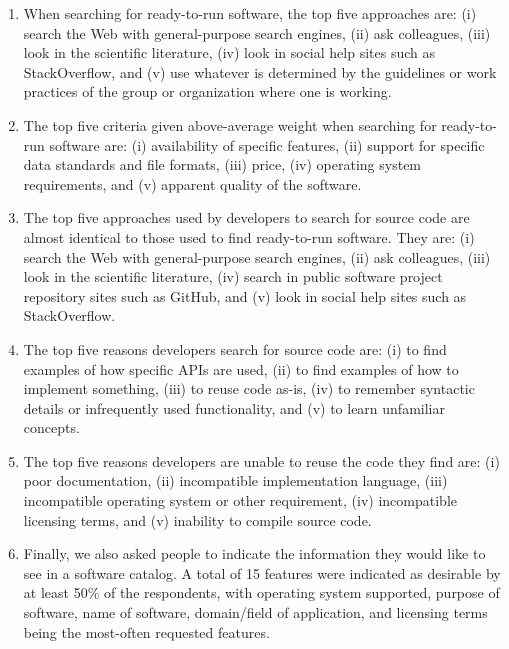 \documentclass{casicswhitepaper}
\begin{document}
\begin{enumerate}

\item When searching for ready-to-run software, the top five approaches are: (i) search the Web with general-purpose search engines, (ii) ask colleagues, (iii) look in the scientific literature, (iv) look in social help sites such as StackOverflow, and (v) use whatever is determined by the guidelines or work practices of the group or organization where one is working.

\item The top five criteria given above-average weight when searching for ready-to-run software are: (i) availability of specific features, (ii) support for specific data standards and file formats, (iii) price, (iv) operating system requirements, and (v) apparent quality of the software.

\item The top five approaches used by developers to search for source code are almost identical to those used to find ready-to-run software.  They are: (i) search the Web with general-purpose search engines, (ii) ask colleagues, (iii) look in the scientific literature, (iv) search in public software project repository sites such as GitHub, and (v) look in social help sites such as StackOverflow.

\item The top five reasons developers search for source code are: (i) to find examples of how specific APIs are used, (ii) to find examples of how to implement something, (iii) to reuse code as-is, (iv) to remember syntactic details or infrequently used functionality, and (v) to learn unfamiliar concepts.

\item The top five reasons developers are unable to reuse the code they find are: (i) poor documentation, (ii) incompatible implementation language, (iii) incompatible operating system or other requirement, (iv) incompatible licensing terms, and (v) inability to compile source code.

\item Finally, we also asked people to indicate the information they would like to see in a software catalog.  A total of 15 features were indicated as desirable by at least 50\% of the respondents, with operating system supported, purpose of software, name of software, domain/field of application, and licensing terms being the most-often requested features. 

\end{enumerate}
\end{document}
